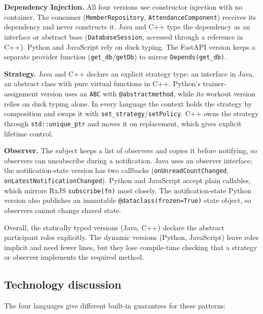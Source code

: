 \documentclass[11pt,a4paper]{article}
\begin{document}
\textbf{Dependency Injection.} All four versions use constructor injection with no container. The consumer (\texttt{MemberRepository}, \texttt{AttendanceComponent}) receives its dependency and never constructs it. Java and C++ type the dependency as an interface or abstract base (\texttt{DatabaseSession}, accessed through a reference in C++). Python and JavaScript rely on duck typing. The FastAPI version keeps a separate provider function (\texttt{get\_db}/\texttt{getDb}) to mirror \texttt{Depends(get\_db)}.

\textbf{Strategy.} Java and C++ declare an explicit strategy type: an interface in Java, an abstract class with pure virtual functions in C++. Python's trainer-assignment version uses an \texttt{ABC} with \texttt{@abstractmethod}, while its workout version relies on duck typing alone. In every language the context holds the strategy by composition and swaps it with \texttt{set\_strategy}/\texttt{setPolicy}. C++ owns the strategy through \texttt{std::unique\_ptr} and moves it on replacement, which gives explicit lifetime control.

\textbf{Observer.} The subject keeps a list of observers and copies it before notifying, so observers can unsubscribe during a notification. Java uses an observer interface; the notification-state version has two callbacks (\texttt{onUnreadCountChanged}, \texttt{onLatestNotificationChanged}). Python and JavaScript accept plain callables, which mirrors RxJS \texttt{subscribe(fn)} most closely. The notification-state Python version also publishes an immutable \texttt{@dataclass(frozen=True)} state object, so observers cannot change shared state.

Overall, the statically typed versions (Java, C++) declare the abstract participant roles explicitly. The dynamic versions (Python, JavaScript) leave roles implicit and need fewer lines, but they lose compile-time checking that a strategy or observer implements the required method.

\subsection{Technology discussion}

The four languages give different built-in guarantees for these patterns:
\end{document}
